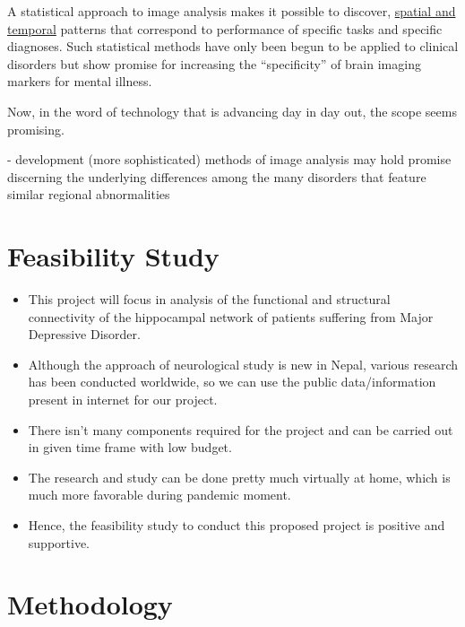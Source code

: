 \documentclass{article}
\begin{document}
A statistical approach to image analysis makes it possible to
discover, \underline{spatial and temporal} patterns that correspond to
performance of specific tasks and specific diagnoses. Such statistical
methods have only been begun to be applied to clinical disorders but
show promise for increasing the ``specificity'' of brain imaging
markers for mental illness.

Now, in the word of technology that is advancing day in day out,
the scope seems promising.

- development (more sophisticated) methods of image analysis may hold
  promise discerning the underlying differences among the many
  disorders that feature similar regional abnormalities


\newpage

\section{Feasibility Study}

\begin{itemize}

  \item This project will focus in analysis of the functional and
    structural connectivity of the hippocampal network of patients
    suffering from Major Depressive Disorder.

  \item Although the approach of neurological study is new in Nepal,
    various research has been conducted worldwide, so we can use the
    public data/information present in internet for our project.

  \item There isn't many components required for the project and can
    be carried out in given time frame with low budget.

  \item The research and study can be done pretty much virtually at
    home, which is much more favorable during pandemic moment.

  \item Hence, the feasibility study to conduct this proposed project
    is positive and supportive.

\end{itemize}

\section{Methodology}
\end{document}
